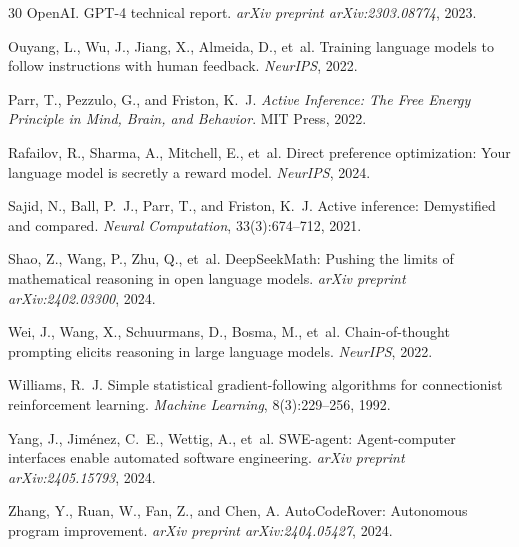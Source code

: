 \begin{thebibliography}{30}
OpenAI.
\newblock GPT-4 technical report.
\newblock \emph{arXiv preprint arXiv:2303.08774}, 2023.

Ouyang, L., Wu, J., Jiang, X., Almeida, D., et~al.
\newblock Training language models to follow instructions with human feedback.
\newblock \emph{NeurIPS}, 2022.

Parr, T., Pezzulo, G., and Friston, K.~J.
\newblock \emph{Active Inference: The Free Energy Principle in Mind, Brain, and
  Behavior}.
\newblock MIT Press, 2022.

Rafailov, R., Sharma, A., Mitchell, E., et~al.
\newblock Direct preference optimization: Your language model is secretly a
  reward model.
\newblock \emph{NeurIPS}, 2024.

Sajid, N., Ball, P.~J., Parr, T., and Friston, K.~J.
\newblock Active inference: Demystified and compared.
\newblock \emph{Neural Computation}, 33(3):674--712, 2021.

Shao, Z., Wang, P., Zhu, Q., et~al.
\newblock DeepSeekMath: Pushing the limits of mathematical reasoning in open
  language models.
\newblock \emph{arXiv preprint arXiv:2402.03300}, 2024.

Wei, J., Wang, X., Schuurmans, D., Bosma, M., et~al.
\newblock Chain-of-thought prompting elicits reasoning in large language models.
\newblock \emph{NeurIPS}, 2022.

Williams, R.~J.
\newblock Simple statistical gradient-following algorithms for connectionist
  reinforcement learning.
\newblock \emph{Machine Learning}, 8(3):229--256, 1992.

Yang, J., Jim{\'e}nez, C.~E., Wettig, A., et~al.
\newblock SWE-agent: Agent-computer interfaces enable automated software
  engineering.
\newblock \emph{arXiv preprint arXiv:2405.15793}, 2024.

Zhang, Y., Ruan, W., Fan, Z., and Chen, A.
\newblock AutoCodeRover: Autonomous program improvement.
\newblock \emph{arXiv preprint arXiv:2404.05427}, 2024.

\end{thebibliography}


